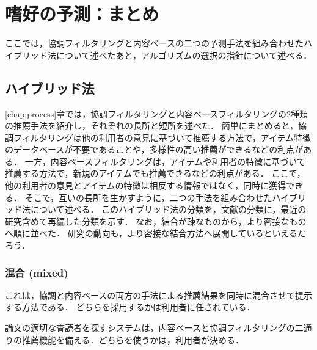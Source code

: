 \chapter{嗜好の予測：まとめ}
\label{chap:hybrid}


ここでは，協調フィルタリングと内容ベースの二つの予測手法を組み合わせたハイブリッド法について述べたあと，アルゴリズムの選択の指針について述べる．

\section{ハイブリッド法}
\label{sec:combmethod}

\ref{chap:process}章では，協調フィルタリングと内容ベースフィルタリングの2種類の推薦手法を紹介し，それぞれの長所と短所を述べた．
簡単にまとめると，協調フィルタリングは他の利用者の意見に基づいて推薦する方法で，アイテム特徴のデータベースが不要であることや，多様性の高い推薦ができるなどの利点がある．
一方，内容ベースフィルタリングは，アイテムや利用者の特徴に基づいて推薦する方法で，新規のアイテムでも推薦できるなどの利点がある．
ここで，他の利用者の意見とアイテムの特徴は相反する情報ではなく，同時に獲得できる．
そこで，互いの長所を生かすように，二つの手法を組み合わせたハイブリッド法について述べる．
このハイブリッド法の分類を，文献\cite{ej:048}の分類に，最近の研究含めて再編した分類を示す．
なお，結合が疎なものから，より密接なものへ順に並べた．
研究の動向も，より密接な結合方法へ展開しているといえるだろう．

\subsection{混合 (mixed)}

これは，協調と内容ベースの両方の手法による推薦結果を同時に混合させて提示する方法である．
どちらを採用するかは利用者に任されている．

論文の適切な査読者を探すシステム\cite{jair:01:01}は，内容ベースと協調フィルタリングの二通りの推薦機能を備える．どちらを使うかは，利用者が決める．


